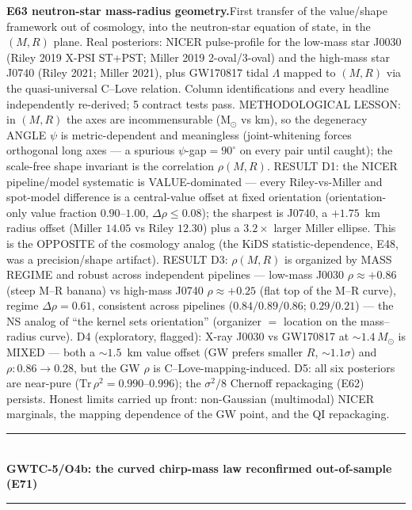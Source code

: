\documentclass[10pt]{article}
\newcommand{\entry}[2]{\vspace{5pt}\noindent\textbf{#1}\quad #2\par}
\newcommand{\grouphead}[1]{\vspace{9pt}\noindent\rule{\linewidth}{0.4pt}\\[-2pt]{\small\textbf{#1}}\\[-4pt]\rule{\linewidth}{0.4pt}\par\vspace{2pt}}
\begin{document}
\entry{E63 neutron-star mass-radius geometry.}{First transfer of the value/shape framework out of
cosmology, into the neutron-star equation of state, in the $(M,R)$ plane. Real posteriors: NICER
pulse-profile for the low-mass star J0030 (Riley 2019 X-PSI ST+PST; Miller 2019 2-oval/3-oval) and
the high-mass star J0740 (Riley 2021; Miller 2021), plus GW170817 tidal $\Lambda$ mapped to $(M,R)$
via the quasi-universal C--Love relation. Column identifications and every headline independently
re-derived; 5 contract tests pass. METHODOLOGICAL LESSON: in $(M,R)$ the axes are incommensurable
(M$_\odot$ vs km), so the degeneracy ANGLE $\psi$ is metric-dependent and meaningless (joint-whitening
forces orthogonal long axes --- a spurious $\psi$-gap$=90^\circ$ on every pair until caught); the
scale-free shape invariant is the correlation $\rho(M,R)$. RESULT D1: the NICER pipeline/model
systematic is VALUE-dominated --- every Riley-vs-Miller and spot-model difference is a central-value
offset at fixed orientation (orientation-only value fraction $0.90$--$1.00$, $\Delta\rho\le0.08$); the
sharpest is J0740, a $+1.75$~km radius offset (Miller $14.05$ vs Riley $12.30$) plus a $3.2\times$
larger Miller ellipse. This is the OPPOSITE of the cosmology analog (the KiDS statistic-dependence,
E48, was a precision/shape artifact). RESULT D3: $\rho(M,R)$ is organized by MASS REGIME and robust
across independent pipelines --- low-mass J0030 $\rho\approx+0.86$ (steep M--R banana) vs high-mass
J0740 $\rho\approx+0.25$ (flat top of the M--R curve), regime $\Delta\rho=0.61$, consistent across
pipelines ($0.84/0.89/0.86$; $0.29/0.21$) --- the NS analog of ``the kernel sets orientation''
(organizer $=$ location on the mass--radius curve). D4 (exploratory, flagged): X-ray J0030 vs
GW170817 at $\sim\!1.4\,M_\odot$ is MIXED --- both a $\sim\!1.5$~km value offset (GW prefers smaller
$R$, $\sim\!1.1\sigma$) and $\rho:0.86\!\to\!0.28$, but the GW $\rho$ is C--Love-mapping-induced. D5:
all six posteriors are near-pure ($\mathrm{Tr}\,\rho^2=0.990$--$0.996$); the $\sigma^2/8$ Chernoff
repackaging (E62) persists. Honest limits carried up front: non-Gaussian (multimodal) NICER marginals,
the mapping dependence of the GW point, and the QI repackaging.}

\grouphead{GWTC-5/O4b: the curved chirp-mass law reconfirmed out-of-sample (E71)}
\end{document}
